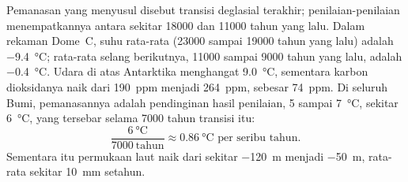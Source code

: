 \begin{example}
Pemanasan yang menyusul  disebut transisi deglasial
terakhir; penilaian-penilaian menempatkannya antara sekitar \num{18000} dan
\num{11000} tahun yang lalu. Dalam rekaman Dome~C, suhu rata-rata  (\num{23000} sampai \num{19000} tahun yang lalu) adalah
\qty{-9.4}{\degreeCelsius}; rata-rata selang berikutnya, \num{11000} sampai
\num{9000} tahun yang lalu, adalah \qty{-0.4}{\degreeCelsius}. Udara di atas
Antarktika menghangat \qty{9.0}{\degreeCelsius}, sementara karbon dioksidanya
naik dari \qty{190}{ppm} menjadi \qty{264}{ppm}, sebesar \qty{74}{ppm}. Di
seluruh Bumi, pemanasannya adalah pendinginan hasil penilaian, 5 sampai
\qty{7}{\degreeCelsius}, sekitar \qty{6}{\degreeCelsius}, yang tersebar selama
\num{7000} tahun transisi itu:
\[
  \frac{\qty{6}{\degreeCelsius}}{\num{7000}\ \text{tahun}} \approx
  \qty{0.86}{\degreeCelsius} \text{ per seribu tahun.}
\]
Sementara itu permukaan laut naik dari sekitar \qty{-120}{m} menjadi
\qty{-50}{m}, rata-rata sekitar \qty{10}{mm} setahun.
\end{example}

